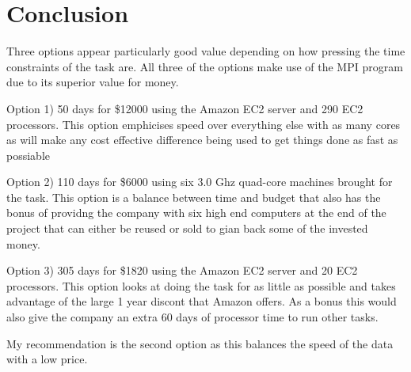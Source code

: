 \section{Conclusion}

Three options appear particularly good value depending on how pressing the time constraints of the task are. All three of the options make use of the MPI program due to its superior value for money.

Option 1) 50 days for \$12000 using the Amazon EC2 server and 290 EC2 processors. This option emphicises speed over everything else with as many cores as will make any cost effective difference being used to get things done as fast as possiable

Option 2) 110 days for \$6000 using six 3.0 Ghz quad-core machines brought for the task. This option is a balance between time and budget that also has the bonus of providng the company with six high end computers at the end of the project that can either be reused or sold to gian back some of the invested money.

Option 3) 305 days for \$1820 using the Amazon EC2 server and 20 EC2 processors. This option looks at doing the task for as little as possible and takes advantage of the large 1 year discont that Amazon offers. As a bonus this would also give the company an extra 60 days of processor time to run other tasks.  


My recommendation is the second option as this balances the speed of the data with a low price.